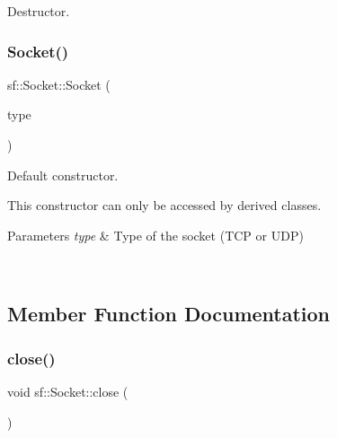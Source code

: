 Destructor. 

\begin{DoxyVerb}\end{DoxyVerb}
 \mbox{\label{classsf_1_1_socket_a80ffb47ec0bafc83af019055d3e6a303}} 
\subsubsection{\texorpdfstring{Socket()}{Socket()}}
{\footnotesize\ttfamily sf\+::\+Socket\+::\+Socket (\begin{DoxyParamCaption}\item[{\mbox{\hyperlink{classsf_1_1_socket_a5d3ff44e56e68f02816bb0fabc34adf8}{Type}}}]{type }\end{DoxyParamCaption})\hspace{0.3cm}{\ttfamily [protected]}}



Default constructor. 

This constructor can only be accessed by derived classes.


\begin{DoxyParams}{Parameters}
{\em type} & Type of the socket (T\+CP or U\+DP) \begin{DoxyVerb}\end{DoxyVerb}
 \\
\hline
\end{DoxyParams}


\subsection{Member Function Documentation}
\mbox{\label{classsf_1_1_socket_a71f2f5c2aa99e01cafe824fee4c573be}} 
\subsubsection{\texorpdfstring{close()}{close()}}
{\footnotesize\ttfamily void sf\+::\+Socket\+::close (\begin{DoxyParamCaption}{ }\end{DoxyParamCaption})\hspace{0.3cm}{\ttfamily [protected]}}



